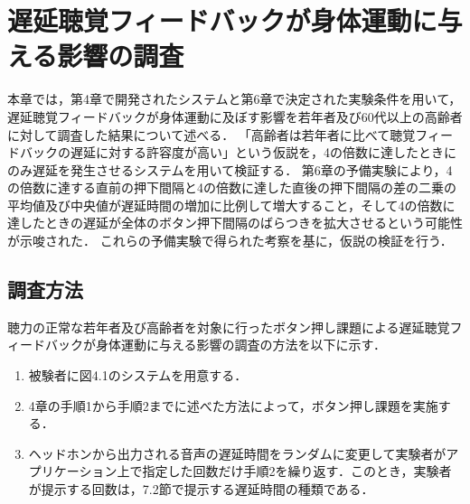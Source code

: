 \chapter{遅延聴覚フィードバックが身体運動に与える影響の調査}
本章では，第4章で開発されたシステムと第6章で決定された実験条件を用いて，遅延聴覚フィードバックが身体運動に及ぼす影響を若年者及び60代以上の高齢者に対して調査した結果について述べる．
「高齢者は若年者に比べて聴覚フィードバックの遅延に対する許容度が高い」という仮説を，4の倍数に達したときにのみ遅延を発生させるシステムを用いて検証する．
第6章の予備実験により，4の倍数に達する直前の押下間隔と4の倍数に達した直後の押下間隔の差の二乗の平均値及び中央値が遅延時間の増加に比例して増大すること，そして4の倍数に達したときの遅延が全体のボタン押下間隔のばらつきを拡大させるという可能性が示唆された．
これらの予備実験で得られた考察を基に，仮説の検証を行う．
\section{調査方法}
聴力の正常な若年者及び高齢者を対象に行ったボタン押し課題による遅延聴覚フィードバックが身体運動に与える影響の調査の方法を以下に示す．
\begin{enumerate}
  \item 被験者に図4.1のシステムを用意する．
  \item 4章の手順1から手順2までに述べた方法によって，ボタン押し課題を実施する．
  \item ヘッドホンから出力される音声の遅延時間をランダムに変更して実験者がアプリケーション上で指定した回数だけ手順2を繰り返す．このとき，実験者が提示する回数は，7.2節で提示する遅延時間の種類である．
\end{enumerate}
